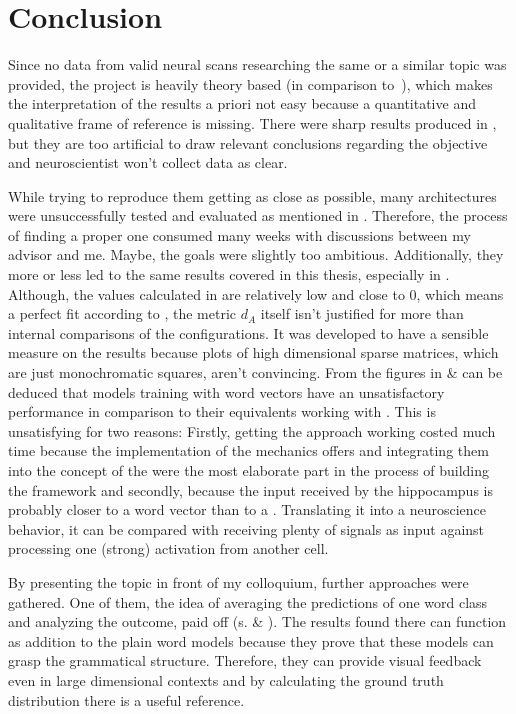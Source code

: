 \chapter{Conclusion}
Since no data from valid neural scans researching the same or a similar topic was provided, the project is heavily theory based (in comparison to~\cite{StBoGe17HPM}), which makes the interpretation of the results a priori not easy because a quantitative and qualitative frame of reference is missing. There were sharp results produced in , but they are too artificial to draw relevant conclusions regarding the objective and neuroscientist won't collect data as clear.

While trying to reproduce them \ie getting as close as possible, many architectures were unsuccessfully tested and evaluated as mentioned in . Therefore, the process of finding a proper one consumed many weeks with discussions between my advisor and me. Maybe, the goals were slightly too ambitious. Additionally, they more or less led to the same results covered in this thesis, especially in . Although, the values calculated in \tabref{\ref{tab: text model versions and metrics}} are relatively low and close to $ 0 $, which means a perfect fit according to , the metric $ d_A $ itself isn't justified for more than internal comparisons of the configurations. It was developed to have a sensible measure on the results because plots of high dimensional sparse matrices, which are just monochromatic squares, aren't convincing. From the figures in \tabref{\ref{tab: text model versions and metrics}} \& \tabref{\ref{tab: avg model versions and metrics}} can be deduced that models training with word vectors have an unsatisfactory performance in comparison to their equivalents working with . This is unsatisfying for two reasons: Firstly, getting the approach working costed much time because the implementation of the mechanics \spacy{} offers and integrating them into the concept of the \cognitiveroom{} were the most elaborate part in the process of building the framework and secondly, because the input received by the hippocampus is probably closer to a word vector than to a \onehot{}. Translating it into a neuroscience behavior, it can be compared with receiving plenty of signals as input against processing one (strong) activation from another cell.

By presenting the topic in front of my colloquium, further approaches were gathered. One of them, the idea of averaging the predictions of one word class and analyzing the outcome, paid off (s.  \& ). The results found there can function as addition to the plain word models because they prove that these models can grasp the grammatical structure. Therefore, they can provide visual feedback even in large dimensional contexts and by calculating the ground truth distribution there is a useful reference.

